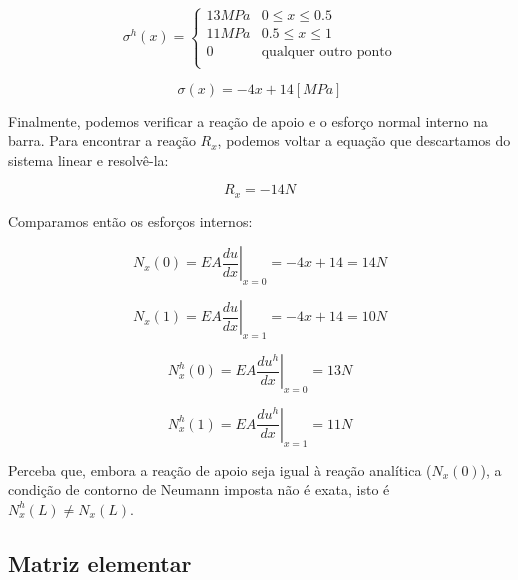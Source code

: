         \begin{equation*}
            \sigma^h(x) = 
            \left\{
            \begin{array}{cl}
                13 MPa & 0 \leq x \leq 0.5\\
                11 MPa & 0.5 \leq x \leq 1\\
                0 & \text{qualquer outro ponto}\\
            \end{array}
            \right.
        \end{equation*}

        \begin{equation*}
            \sigma(x) = -4x + 14 [MPa]
        \end{equation*}

        Finalmente, podemos verificar a reação de apoio e o esforço normal interno na barra. Para encontrar a reação $R_x$, podemos voltar a equação que descartamos do sistema linear e resolvê-la:

        \begin{equation*}
            R_x = -14 N
        \end{equation*}

        Comparamos então os esforços internos:

        \begin{equation*}
            N_x(0) = \left.EA\frac{du}{dx}\right|_{x=0} = -4x+14 = 14 N
        \end{equation*}

        \begin{equation*}
            N_x(1) = \left.EA\frac{du}{dx}\right|_{x=1} = -4x+14 = 10 N
        \end{equation*}

        \begin{equation*}
            N_x^h(0) = \left.EA\frac{du^h}{dx}\right|_{x=0} = 13N
        \end{equation*}

        \begin{equation*}
            N_x^h(1) = \left.EA\frac{du^h}{dx}\right|_{x=1} = 11 N
        \end{equation*}

        Perceba que, embora a reação de apoio seja igual à reação analítica ($N_x(0)$), a condição de contorno de Neumann imposta não é exata, isto é $N_x^h(L) \neq N_x(L)$.

    \subsection{Matriz elementar}

